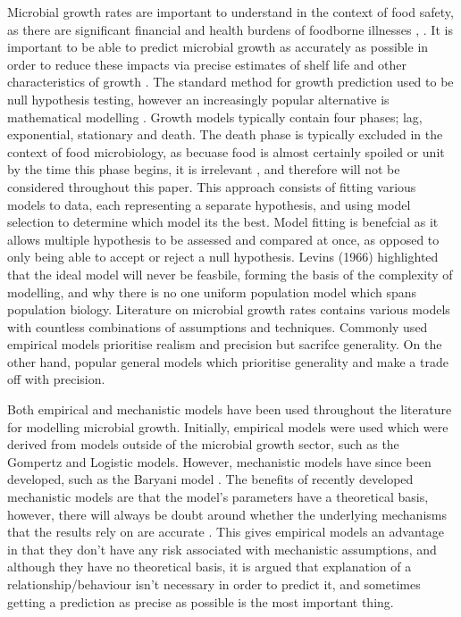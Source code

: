 \documentclass[11pt, a4paper, titlepage]{article}
\begin{document}
    Microbial growth rates are important to understand in the context of food safety, as there are significant financial and health burdens of foodborne illnesses \cite{daniel2020burden}, \cite{world2015estimates}. It is important to be able to predict microbial growth as accurately as possible in order to reduce these impacts via precise estimates of shelf life and other characteristics of growth \cite{mcmeekin1996shelf}. The standard method for growth prediction used to be null hypothesis testing, however an increasingly popular alternative is mathematical modelling \cite{foegeding1997driving}. Growth models typically contain four phases; lag, exponential, stationary and death. The death phase is typically excluded in the context of food microbiology, as becuase food is almost certainly spoiled or unit by the time this phase begins, it is irrelevant \cite{ross2003modeling}, and therefore will not be considered throughout this paper. This approach consists of fitting various models to data, each representing a separate hypothesis, and using model selection to determine which model its the best. Model fitting is benefcial as it allows multiple hypothesis to be assessed and compared at once, as opposed to only being able to accept or reject a null hypothesis. Levins (1966) highlighted that the ideal model will never be feasbile, forming the basis of the complexity of modelling, and why there is no one uniform population model which spans population biology. Literature on microbial growth rates contains various models with countless combinations of assumptions and techniques. Commonly used empirical models prioritise realism and precision but sacrifce generality. On the other hand, popular general models which prioritise generality and make a trade off with precision.
    
    Both empirical and mechanistic models have been used throughout the literature for modelling microbial growth. Initially, empirical models were used which were derived from models outside of the microbial growth sector, such as the Gompertz and Logistic models. However, mechanistic models have since been developed, such as the Baryani model \cite{grijspeerdt1999estimating}. The benefits of recently developed mechanistic models are that the model's parameters have a theoretical basis, however, there will always be doubt around whether the underlying mechanisms that the results rely on are accurate \cite{lopez2004statistical}. This gives empirical models an advantage in that they don't have any risk associated with mechanistic assumptions, and although they have no theoretical basis, it is argued that explanation of a relationship/behaviour isn't necessary in order to predict it, and sometimes getting a prediction as precise as possible is the most important thing.
    
\end{document}
